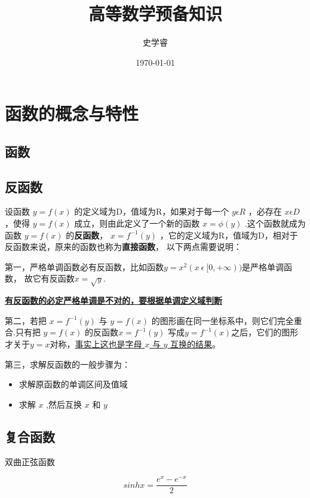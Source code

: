 \documentclass[cn,normal,11pt,black]{elegantnote}
\title{高等数学预备知识}
\author{史学睿}
\date{\today}
\begin{document}
    \maketitle

    \section{函数的概念与特性}
    \subsection{函数}
    \subsection{反函数}
            
    设函数 $y=f(x)$ 的定义域为D，值域为R，如果对于每一个 $y \epsilon R$ ，必存在 $x \epsilon D$ ，使得
$y=f(x)$ 成立，则由此定义了一个新的函数 $x= \phi(y)$ .这个函数就成为函数 $y=f(x)$ 的\textbf{反函数}，
 $x= f^{-1}(y)$ ，它的定义域为R，值域为D，相对于反函数来说，原来的函数也称为\textbf{直接函数}，
以下两点需要说明：

第一，严格单调函数必有反函数，比如函数$y=x^2 (x \ \epsilon \ [0,+ \infty) )$是严格单调函数，
故它有反函数$x= \sqrt{y}$.

\underline{\textbf{有反函数的必定严格单调是不对的，要根据单调定义域判断}}

第二，若把 $x= f^{-1}(y)$ 与 $y=f(x)$ 的图形画在同一坐标系中，则它们完全重合.只有把 $y=f(x)$ 的反函数$x= f^{-1}(y)$
写成$y=f^{-1}(x)$之后，它们的图形才关于$y=x$对称，\underline{事实上这也是字母 $x$ 与 $y$ 互换的结果}。

第三，求解反函数的一般步骤为：
\begin{itemize}
    \item 求解原函数的单调区间及值域
    \item 求解 $ x $ ,然后互换 $x$ 和 $y$
\end{itemize}

    \subsection{复合函数}

    双曲正弦函数 

    \begin{equation}
        sinhx = \frac{e^x-e^{-x}}{2}
    \end{equation}

    \clearpage
\end{document}
